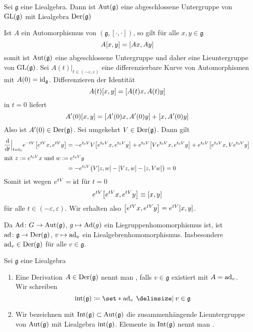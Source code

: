 \begin{proposition}[label=prop:162]
	Sei $\mathfrak{g}$ eine Liealgebra.
	Dann ist $\operatorname{Aut}(\mathfrak{g})$ eine abgeschlossene Untergruppe von $\operatorname{GL}(\mathfrak{g})$ mit Liealgebra $\operatorname{Der}(\mathfrak{g})$
\end{proposition}
\begin{beweis}
	Ist $A$ ein Automorphismus von $(\mathfrak{g},[\cdot ,\cdot ])$, so gilt für alle $x,y \in  \mathfrak{g}$
	\[
		A \benbrace*{x,y} = \benbrace*{A x, A y}
	\]
	somit ist $\operatorname{Aut}(\mathfrak{g})$ eine abgeschlossene Untergruppe und daher eine Lieuntergruppe von $\operatorname{GL}(\mathfrak{g})$.
	Sei $A(t)\big|_{t \in (-\varepsilon,\varepsilon)}$ eine differenzierbare Kurve von Automorphismen mit $A(0) = {\operatorname{id}_{\mathfrak{g}}}$.
	Differenzieren der Identität
	\[
		A(t) \benbrace*{x,y} = \benbrace*{A(t) x, A(t) y}
	\]
	 in $t=0$ liefert
	 \[
	 	A'(0) \benbrace*{x,y} = \benbrace*{A'(0) x , A'(0) y} + \benbrace*{x, A'(0)y}
	 \]
	 Also ist $A'(0) \in \operatorname{Der}(\mathfrak{g})$.
	 Sei umgekehrt $V \in \operatorname{Der}(\mathfrak{g})$.
	 Dann gilt
	 \begin{align}
	 	\diffd{}{t}\Big|_{t=t_0} e^{-tV} \benbrace*{e^{tV}x, e^{tV}y} &= - e^{t_0 V} V \benbrace*{e^{t_0 V} x, e^{t_0 V} y} + e^{t_0 V} \benbrace*{V e^{t_0 V} x, e^{t_0 V} y} + e^{t_0 V} \benbrace*{e^{t_0 V} x , V e^{t_0 V} y} \\
		\intertext{mit $z := e^{t_0 V} x$ und $w := e^{t_0 V}y$}
		&= - e^{t_0 V} \enbrace[\big]{V \benbrace*{z,w} - \benbrace*{Vz,w} - \benbrace*{z,Vw}} =0
	 \end{align}
	 Somit ist wegen $e^{tV}={\operatorname{id}}$ für $t=0$
	 \[
	 	e^{tV} \benbrace*{e^{tV}x, e^{tV}y} \equiv \benbrace*{x,y}
	 \]
	 für alle $t \in (-\varepsilon,\varepsilon)$.
	 Wir erhalten also $\benbrace*{e^{tV}x, e^{tV}y}= e^{tV}\benbrace*{x,y}$.
\end{beweis}

Da $\operatorname{Ad} \colon G  \to \operatorname{Aut}(\mathfrak{g})$, $g \mapsto \operatorname{Ad}(g)$ ein Liegruppenhomomorphismus ist, ist $\operatorname{ad} \colon \mathfrak{g} \to \operatorname{Der}(\mathfrak{g})$, $v \mapsto \operatorname{ad}_v$ ein Liealgebrenhomomorphismus.
Insbesondere $\operatorname{ad}_v \in \operatorname{Der}(\mathfrak{g})$ für alle $v \in \mathfrak{g}$.

\begin{definition}
	Sei $\mathfrak{g}$ eine Liealgebra
	\begin{enumerate}[1)]
		\item Eine Derivation $A \in \operatorname{Der}(\mathfrak{g})$ nennt man , falls $v \in \mathfrak{g}$ existiert mit $A = \operatorname{ad}_v$.
		Wir schreiben 
		\[
			\intAlg(\mathfrak{g}) \coloneqq \set*{\ad_v \given v \in \mathfrak{g}}
		\] 
		\item Wir bezeichnen mit $\operatorname{Int}(\mathfrak{g}) \subset \operatorname{Aut}(\mathfrak{g})$ die zusammenhängende Lieuntergruppe von $\operatorname{Aut}(\mathfrak{g})$ mit Liealgebra $\operatorname{int}(\mathfrak{g})$.
		Elemente in $\operatorname{Int}(\mathfrak{g})$ nennt man .
	\end{enumerate}
\end{definition}

